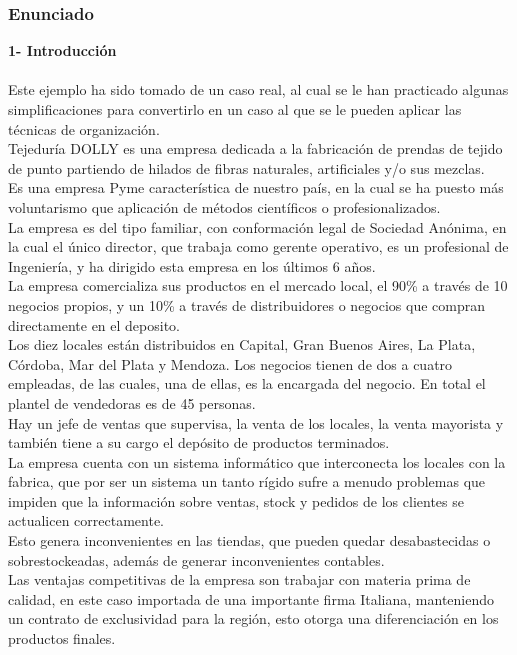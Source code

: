 \documentclass[a4paper,10pt,titlepage]{article}
\begin{document}
  \subsubsection{Enunciado}
	\vspace{0.5cm}
	 \textbf{1- Introducci\'on}\\\\
		\indent Este ejemplo ha sido tomado de un caso real, al cual se le han practicado algunas simplificaciones para convertirlo en un caso al que se le pueden aplicar las t\'ecnicas de organizaci\'on.\\
		\indent Tejedur\'ia DOLLY es una empresa dedicada a la fabricaci\'on de prendas de tejido de punto partiendo de hilados de fibras naturales, artificiales y/o sus mezclas.\\
		\indent Es una empresa Pyme caracter\'istica de nuestro pa\'is, en la cual se ha puesto m\'as voluntarismo que aplicaci\'on de m\'etodos cient\'ificos o profesionalizados.\\
		\indent La empresa es del tipo familiar, con conformaci\'on legal de Sociedad An\'onima, en la cual el \'unico director, que trabaja como gerente operativo, es un profesional de Ingenier\'ia, y ha dirigido esta empresa en los \'ultimos 6 años.\\
		\indent La empresa comercializa sus productos en el mercado local, el 90\% a trav\'es de 10 negocios propios, y un 10\% a trav\'es de distribuidores o negocios que compran directamente en el deposito.\\
		\indent Los diez locales est\'an distribuidos en Capital, Gran Buenos Aires, La Plata, C\'ordoba, Mar del Plata y Mendoza. Los negocios tienen de dos a cuatro empleadas, de las cuales, una de ellas, es la encargada del negocio. En total el plantel de vendedoras es de 45 personas.\\
		\indent Hay un jefe de ventas que supervisa, la venta de los locales, la venta mayorista y tambi\'en tiene a su cargo el dep\'osito de productos terminados.\\
		\indent La empresa cuenta con un sistema inform\'atico que interconecta los locales con la fabrica, que por ser un sistema un tanto r\'igido sufre a menudo problemas que impiden que la informaci\'on sobre ventas, stock y pedidos de los clientes se actualicen correctamente.\\
		\indent Esto genera inconvenientes en las tiendas, que pueden quedar desabastecidas o sobrestockeadas, adem\'as de generar inconvenientes contables.\\
		\indent Las ventajas competitivas de la empresa son trabajar con materia prima de calidad, en este caso importada de una importante firma Italiana, manteniendo un contrato de exclusividad para la regi\'on, esto otorga una diferenciaci\'on en los productos finales.\\
\end{document}
